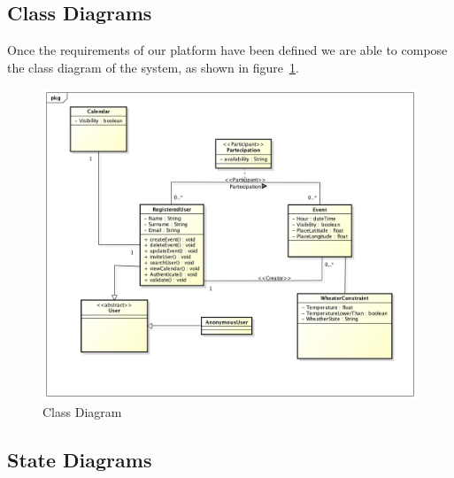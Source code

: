 \subsection{Class Diagrams}
Once the requirements of our platform have been defined we are able to compose the class diagram  of the system, as shown in figure~\ref{fig:classdiagram}.
\begin{center}
 \begin{figure}[H]
    \includegraphics[width=1\textwidth]{../UMLDiagram/class/WeatherCalClassDiagram/ClassDiagram0.png}
    \caption{Class Diagram}
     \label{fig:classdiagram}
     \end{figure}
   \end{center}  
\subsection{State Diagrams}
